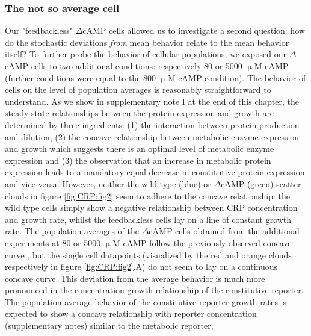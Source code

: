\subsubsection*{The not so average cell}

Our "feedbackless" $\Delta$cAMP cells allowed us to investigate a second question:
how do the stochastic deviations \textit{from} mean behavior relate to the mean behavior itself?
%
To further probe the behavior of cellular populations, we exposed our $\Delta$cAMP cells to two additional conditions: 
%
respectively 80 or 5000 $\upmu$M cAMP (further conditions were equal to the 800 $\upmu$M cAMP condition).
%
The behavior of cells on the level of population averages is reasonably straightforward to understand.
%
As we show in supplementary note I at the end of this chapter, the steady state relationships between the protein expression and growth are determined by three ingredients:
(1) the interaction between protein production and dilution, (2) the concave relationship between metabolic enzyme expression and growth which suggests there is an optimal level of metabolic enzyme expression and (3) the observation that an increase in metabolic protein expression leads to a mandatory equal decrease in constitutive protein expression and vice versa.
%
However, neither the wild type (blue) or $\Delta$cAMP (green) scatter clouds in figure \ref{fig:CRP:fig2} seem to adhere to the concave relationship:
%
the wild type cells simply show a negative relationship between CRP concentration and growth rate, whilst the feedbackless cells lay on a line of constant growth rate.
%
The population averages of the $\Delta$cAMP cells obtained from the additional experiments at  80 or 5000 $\upmu$M cAMP follow the previously observed concave curve \cite{Towbin2017}, 
but the single cell datapoints (visualized by the red and orange clouds respectively in figure \ref{fig:CRP:fig2}.A) do not seem to lay on a continuous concave curve.
%
%
This deviation from the average behavior is much more pronounced in the concentration-growth relationship of the constitutive reporter.
The population average behavior of the constitutive reporter growth rates is expected to show a concave relationship with reporter concentration (supplementary notes) similar to the metabolic reporter,

